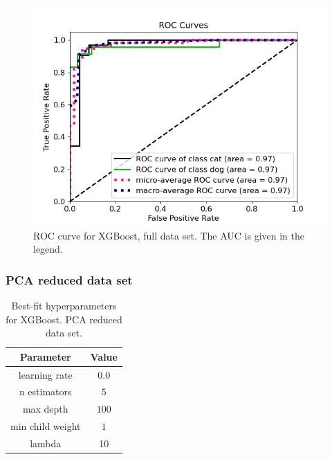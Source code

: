 \documentclass[a4paper]{article}
\begin{document}
\begin{figure}[H]
	\centering
	\includegraphics[scale=0.5]{../figures/xgboost/roc_nbins200_pca0_seed4155_ts0.20.png}
	\caption{ROC curve for XGBoost, full data set. The AUC is given in the legend.}
	\label{fig:xgboost_roc_nonpca}
\end{figure}	

\subsubsection{PCA reduced data set}

\begin{table}[H]
  \centering
  \caption{Best-fit hyperparameters for XGBoost. PCA reduced data set.}
  \label{tab:best_fit_xgboost_pca}
  \begin{tabular}{c|c}
    \hline\hline
    Parameter & Value\\\hline
    learning rate  & $0.0$\\
    n estimators &  $5$\\
    max depth &  $100$\\
    min child weight & $1$ \\
    lambda & 10
    \end{tabular}
\end{table}
\end{document}
